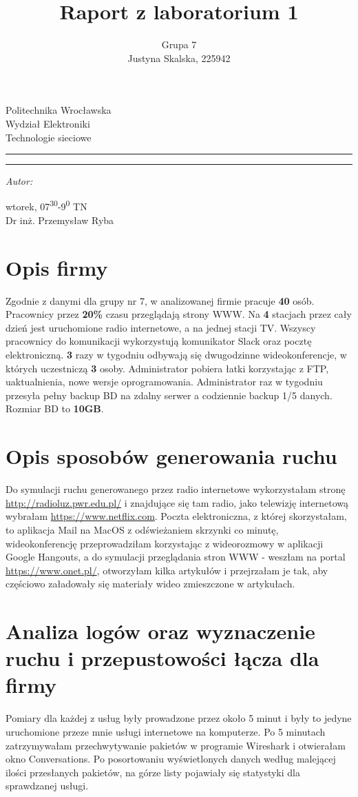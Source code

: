\documentclass[12pt,a4paper,titlepage]{article}
\author{Grupa 7\\
        Justyna Skalska, 225942}
\title{Raport z laboratorium 1}
\makeatletter
\newcommand{\linia}{\rule{\linewidth}{0.4mm}}
\renewcommand{\maketitle}{\begin{titlepage}
    \vspace*{1cm}
    \begin{center}\small
    Politechnika Wrocławska\\
    Wydział Elektroniki\\
    Technologie sieciowe
    \end{center}
    \vspace{3cm}
    \noindent\linia
    \begin{center}
      \LARGE \textsc{\@title}
         \end{center}
     \linia
    \vspace{0.5cm}
    \begin{flushright}
    \begin{minipage}{7cm}
    \textit{\small Autor:}\\
    \normalsize \textsc{\@author} \par
    \end{minipage}
    \vspace{5cm}

     {\small wtorek, 07\textsuperscript{30}-9\textsuperscript{0} TN}\\
        Dr inż. Przemysław Ryba
     \end{flushright}
    \vspace*{\stretch{6}}
    \begin{center}
    \@date
    \end{center}
  \end{titlepage}%
}
\makeatother
\begin{document}
\maketitle

\section{Opis firmy}

Zgodnie z danymi dla grupy nr 7, w analizowanej firmie pracuje {\bfseries 40 }osób. Pracownicy przez {\bfseries 20\%} czasu przeglądają strony WWW. Na {\bfseries 4} stacjach przez cały dzień jest uruchomione radio internetowe, a na jednej stacji TV. Wszyscy pracownicy do komunikacji wykorzystują komunikator Slack oraz pocztę elektroniczną. {\bfseries 3} razy w tygodniu odbywają się dwugodzinne wideokonferencje, w których uczestniczą {\bfseries 3} osoby. Administrator pobiera łatki korzystając z FTP, uaktualnienia, nowe wersje oprogramowania. Administrator raz w tygodniu przesyła pełny backup BD na zdalny serwer a codziennie backup 1/5 danych. Rozmiar BD to {\bfseries 10GB}.

\section{Opis sposobów generowania ruchu}
Do symulacji ruchu generowanego przez radio internetowe wykorzystałam stronę \url{http://radioluz.pwr.edu.pl/} i znajdujące się tam radio, jako telewizję internetową wybrałam \url{https://www.netflix.com}. Poczta elektroniczna, z której skorzystałam, to aplikacja Mail na MacOS z odświeżaniem skrzynki co minutę, wideokonferencję przeprowadziłam korzystając z wideorozmowy w aplikacji Google Hangouts, a do symulacji przeglądania stron WWW - weszłam na portal \url{https://www.onet.pl/}, otworzyłam kilka artykułów i przejrzałam je tak, aby częściowo załadowały się materiały wideo zmieszczone w artykułach. 

\section{Analiza logów oraz wyznaczenie ruchu i przepustowości łącza dla firmy}

Pomiary dla każdej z usług były prowadzone przez około 5 minut i były to jedyne uruchomione przeze mnie usługi internetowe na komputerze. Po 5 minutach zatrzymywałam przechwytywanie pakietów w programie Wireshark i otwierałam okno Conversations. Po posortowaniu wyświetlonych danych według malejącej ilości przesłanych pakietów, na górze listy pojawiały się statystyki dla sprawdzanej usługi.
\end{document}

